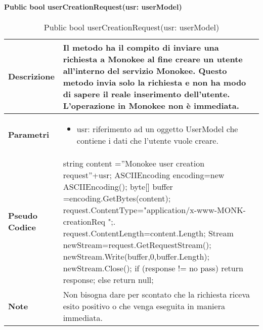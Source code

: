     \paragraph{Public bool userCreationRequest(usr: userModel)}
    \begin{center}
        \begin{longtable}{|p{3cm}|p{9cm}|}%
        \caption{Public bool userCreationRequest(usr: userModel)}
        \label{tab:public-boll-userCreationRequestImpl}
        \endfirsthead
        \endhead
        \hline
        \textbf{Descrizione} & Il metodo ha il compito di inviare una richiesta a Monokee al fine creare un utente all’interno del servizio Monokee. Questo metodo invia solo la richiesta e non ha modo di sapere il reale inserimento dell’utente. L’operazione in Monokee non è immediata. \\
        \hline
        \textbf{Parametri} &      
            \begin{itemize}
                \item usr: riferimento ad un oggetto UserModel che contiene i dati che l'utente vuole creare.
            \end{itemize}
        \\
        \hline
        \textbf{Pseudo Codice} & 
        string content =”Monokee user creation request”+usr;\newline
        ASCIIEncoding encoding=new ASCIIEncoding();\newline
        byte[]  buffer =encoding.GetBytes(content);\newline
        request.ContentType="application/x-www-MONK-creationReq ";\newline.
        request.ContentLength=content.Length;\newline
        Stream newStream=request.GetRequestStream();\newline
        newStream.Write(buffer,0,buffer.Length);\newline
        newStream.Close();\newline
        if (response != no pass) return response;\newline
        else return null;\newline
        \\
        \hline
        \textbf{Note} & Non bisogna dare per scontato che la richiesta riceva esito positivo o che venga eseguita in maniera immediata. \\
        \hline
        \end{longtable}
        \end{center}

